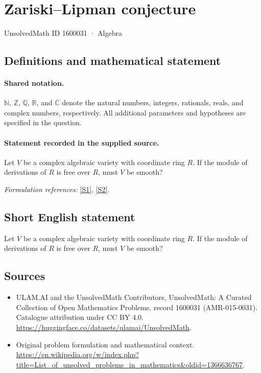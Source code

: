 \documentclass[11pt]{article}
\newcommand{\sref}[2]{\hyperlink{source:#1:#2}{[S#2]}}
\begin{document}
\setcounter{section}{1600030}
\section{Zariski–Lipman conjecture}\label{1600031}
{\small UnsolvedMath ID 1600031 · Algebra}
\subsection{Definitions and mathematical statement}

\paragraph{Shared notation.}$\mathbb N$, $\mathbb Z$, $\mathbb Q$, $\mathbb R$, and $\mathbb C$ denote the natural numbers, integers, rationals, reals, and complex numbers, respectively. All additional parameters and hypotheses are specified in the question.


\paragraph{Statement recorded in the supplied source.}
Let $V$ be a complex algebraic variety with coordinate ring $R$. If the module of derivations of $R$ is free over $R$, must $V$ be smooth?
\par\smallskip\textit{Formulation references:} \sref{1600031}{1}, \sref{1600031}{2}.
\subsection{Short English statement}
Let $V$ be a complex algebraic variety with coordinate ring $R$. If the module of derivations of $R$ is free over $R$, must $V$ be smooth?
\subsection{Sources}
\begin{itemize}
\item[\hypertarget{source:1600031:1}{S1}] ULAM.AI and the UnsolvedMath Contributors, UnsolvedMath: A Curated Collection of Open Mathematics Problems, record 1600031 (AMR-015-0031). Catalogue attribution under CC BY 4.0.
\url{https://huggingface.co/datasets/ulamai/UnsolvedMath}.
\item[\hypertarget{source:1600031:2}{S2}] Original problem formulation and mathematical context.
\url{https://en.wikipedia.org/w/index.php?title=List_of_unsolved_problems_in_mathematics&oldid=1366636767}.
\end{itemize}
\label{end:1600031}
\end{document}
